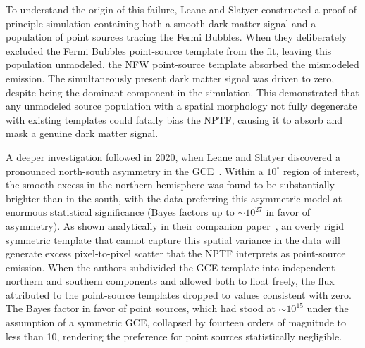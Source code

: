 To understand the origin of this failure, Leane and Slatyer constructed a proof-of-principle simulation containing both a smooth dark matter signal and a population of point sources tracing the Fermi Bubbles.
When they deliberately excluded the Fermi Bubbles point-source template from the fit, leaving this population unmodeled, the NFW point-source template absorbed the mismodeled emission.
The simultaneously present dark matter signal was driven to zero, despite being the dominant component in the simulation.
This demonstrated that any unmodeled source population with a spatial morphology not fully degenerate with existing templates could fatally bias the NPTF, causing it to absorb and mask a genuine dark matter signal.

A deeper investigation followed in 2020, when Leane and Slatyer discovered a pronounced north-south asymmetry in the GCE~\cite{Leane:2020nmi,Leane:2020pfc}.
Within a $10^\circ$ region of interest, the smooth excess in the northern hemisphere was found to be substantially brighter than in the south, with the data preferring this asymmetric model at enormous statistical significance (Bayes factors up to $\sim 10^{27}$ in favor of asymmetry).
As shown analytically in their companion paper~\cite{Leane:2020pfc}, an overly rigid symmetric template that cannot capture this spatial variance in the data will generate excess pixel-to-pixel scatter that the NPTF interprets as point-source emission.
When the authors subdivided the GCE template into independent northern and southern components and allowed both to float freely, the flux attributed to the point-source templates dropped to values consistent with zero.
The Bayes factor in favor of point sources, which had stood at $\sim 10^{15}$ under the assumption of a symmetric GCE, collapsed by fourteen orders of magnitude to less than 10, rendering the preference for point sources statistically negligible.

